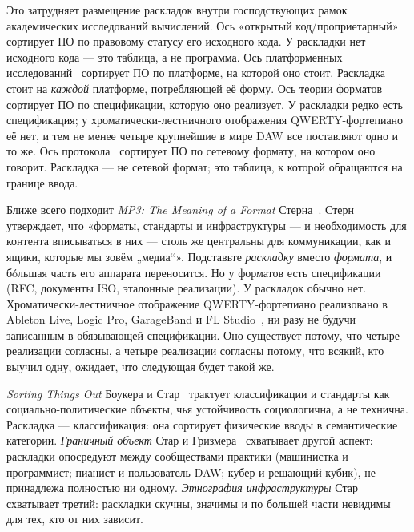 \documentclass[10pt,letterpaper,twocolumn]{article}
\begin{document}
Это затрудняет размещение раскладок внутри господствующих рамок академических исследований вычислений. Ось «открытый код/проприетарный»~\citep{galloway2004protocol} сортирует ПО по правовому статусу его исходного кода. У раскладки нет исходного кода --- это таблица, а не программа. Ось платформенных исследований~\citep{nieborg2018platformization} сортирует ПО по платформе, на которой оно стоит. Раскладка стоит на \emph{каждой} платформе, потребляющей её форму. Ось теории форматов~\citep{sterne2012mp3} сортирует ПО по спецификации, которую оно реализует. У раскладки редко есть спецификация; у хроматически-лестничного отображения QWERTY-фортепиано её нет, и тем не менее четыре крупнейшие в мире DAW все поставляют одно и то же. Ось протокола~\citep{galloway2004protocol} сортирует ПО по сетевому формату, на котором оно говорит. Раскладка --- не сетевой формат; это таблица, к которой обращаются на границе ввода.

Ближе всего подходит \emph{MP3: The Meaning of a Format} Стерна~\citep{sterne2012mp3}. Стерн утверждает, что «форматы, стандарты и инфраструктуры --- и необходимость для контента вписываться в них --- столь же центральны для коммуникации, как и ящики, которые мы зовём „медиа“». Подставьте \emph{раскладку} вместо \emph{формата}, и бóльшая часть его аппарата переносится. Но у форматов есть спецификации (RFC, документы ISO, эталонные реализации). У раскладок обычно нет. Хроматически-лестничное отображение QWERTY-фортепиано реализовано в Ableton Live, Logic Pro, GarageBand и FL Studio~\citep{ableton_musical_typing,apple_logic_musicaltyping,imageline_typing_piano}, ни разу не будучи записанным в обязывающей спецификации. Оно существует потому, что четыре реализации согласны, а четыре реализации согласны потому, что всякий, кто выучил одну, ожидает, что следующая будет такой же.

\emph{Sorting Things Out} Боукера и Стар~\citep{bowker1999sorting} трактует классификации и стандарты как социально-политические объекты, чья устойчивость социологична, а не технична. Раскладка --- классификация: она сортирует физические вводы в семантические категории. \emph{Граничный объект} Стар и Гризмера~\citep{star1989boundary} схватывает другой аспект: раскладки опосредуют между сообществами практики (машинистка и программист; пианист и пользователь DAW; кубер и решающий кубик), не принадлежа полностью ни одному. \emph{Этнография инфраструктуры} Стар~\citep{star1999ethnography} схватывает третий: раскладки скучны, значимы и по большей части невидимы для тех, кто от них зависит.
\end{document}
